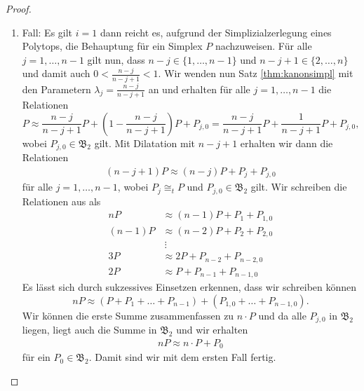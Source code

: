\documentclass[11pt,titlepage]{article}
\theoremstyle{definition}
\theoremstyle{remark}
\begin{document}
	\begin{proof}
		\noindent
		\begin{enumerate}
			\item Fall: Es gilt $i=1$ dann reicht es, aufgrund 
			der Simplizialzerlegung eines Polytops, die 
			Behauptung für ein Simplex $P$ nachzuweisen. Für alle $j=1,\ldots,n-1$ 
			gilt nun, dass $n-j\in\{1,\ldots,n-1\}$ und $n-j+1\in\{2,\ldots,n\}$ 
			und damit auch $0<\frac{n-j}{n-j+1}<1$. Wir wenden nun  
			Satz \ref{thm:kanonsimpl} mit den Parametern 
			$\lambda_j=\frac{n-j}{n-j+1}$ an und 
			erhalten für alle $j=1,\ldots,n-1$ die Relationen 
			\[P\approx \frac{n-j}{n-j+1} P+\left(1-\frac{n-j}{n-j+1}\right)P+P_{j,0}
			=\frac{n-j}{n-j+1}P+\frac{1}{n-j+1}P+P_{j,0},\]
			wobei $P_{j,0}\in\mathfrak{B}_2$ gilt. Mit Dilatation mit 
			$n-j+1$ erhalten wir dann die Relationen 
			\begin{align*}
				(n-j +1)P\approx (n-j )P+P_j+P_{j, 0} 
			\end{align*}
			für alle $j=1,\ldots,n-1$, wobei $P_{j}\cong_t P$ und 
			$P_{j, 0}\in\mathfrak{B}_2$ gilt. Wir schreiben die Relationen 
			aus als
			\begin{align*}
				nP &\approx (n-1)P+P_1+P_{1,0} \\
				(n-1)P &\approx (n-2)P+P_2 +P_{2,0} \\
				&\ \vdots \\
				3P &\approx 2P +P_{n-2}+P_{n-2,0} \\
				2P &\approx P +P_{n-1}+P_{n-1,0}
			\end{align*}
			Es lässt sich durch sukzessives Einsetzen erkennen, dass wir 
			schreiben können 
			\[nP\approx (P+P_1+\ldots+P_{n-1})+(P_{1,0}+\ldots+P_{n-1,0}).\]
			Wir können die erste Summe zusammenfassen zu $n \cdot P$ 
			und da alle $P_{j,0}$ in $\mathfrak{B}_2$ liegen, liegt auch 
			die Summe in $\mathfrak{B}_2$ und wir erhalten
			\begin{align}
				nP\approx n\cdot P+ P_0 \label{thm:zyl;1}
			\end{align}
			für ein $P_0\in\mathfrak{B}_2$. Damit sind wir mit dem 
			ersten Fall fertig.
			

\end{enumerate}
\end{proof}
\end{document}
